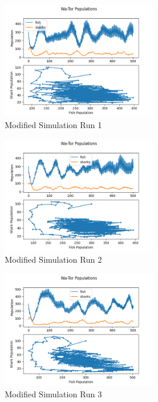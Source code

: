 \documentclass[12pt]{iopart} %
\begin{document}
\begin{figure}[htbp]
  \begin{center}
  \item[]\includegraphics[width=0.6\textwidth]{run4plots.png}
  \end{center}
  \caption{\label{fig:run4plots}
  Modified Simulation Run 1
  }
\end{figure}

\begin{figure}[htbp]
  \begin{center}
  \item[]\includegraphics[width=0.6\textwidth]{run5plots.png}
  \end{center}
  \caption{\label{fig:run5plots}
  Modified Simulation Run 2
  }
\end{figure}

\begin{figure}[htbp]
  \begin{center}
  \item[]\includegraphics[width=0.6\textwidth]{run6plots.png}
  \end{center}
  \caption{\label{fig:run6plots}
  Modified Simulation Run 3
  }
\end{figure}
\end{document}
